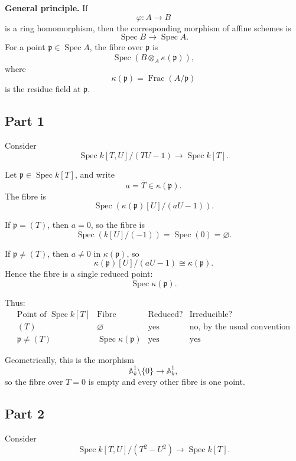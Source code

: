 \documentclass[12pt,a4paper]{article}
\theoremstyle{notespace}
\begin{document}
\textbf{General principle.}
If
\[
\varphi:A\longrightarrow B
\]
is a ring homomorphism, then the corresponding morphism of affine schemes
is
\[
\operatorname{Spec}B\longrightarrow \operatorname{Spec}A.
\]
For a point \(\mathfrak{p}\in \operatorname{Spec}A\), the fibre over
\(\mathfrak{p}\) is
\[
\operatorname{Spec}\left(B\otimes_A \kappa(\mathfrak{p})\right),
\]
where
\[
\kappa(\mathfrak{p})
=
\operatorname{Frac}(A/\mathfrak{p})
\]
is the residue field at \(\mathfrak{p}\).

\subsection{Part 1}

Consider
\[
\operatorname{Spec} k[T,U]/(TU-1)
\longrightarrow
\operatorname{Spec} k[T].
\]

Let \(\mathfrak{p}\in \operatorname{Spec}k[T]\), and write
\[
a=\overline{T}\in \kappa(\mathfrak{p}).
\]
The fibre is
\[
\operatorname{Spec}
\left(
\kappa(\mathfrak{p})[U]/(aU-1)
\right).
\]

If \(\mathfrak{p}=(T)\), then \(a=0\), so the fibre is
\[
\operatorname{Spec}\left(k[U]/(-1)\right)
=
\operatorname{Spec}(0)
=
\varnothing.
\]

If \(\mathfrak{p}\neq (T)\), then \(a\neq 0\) in \(\kappa(\mathfrak{p})\),
so
\[
\kappa(\mathfrak{p})[U]/(aU-1)
\cong
\kappa(\mathfrak{p}).
\]
Hence the fibre is a single reduced point:
\[
\operatorname{Spec}\kappa(\mathfrak{p}).
\]

Thus:
\[
\begin{array}{c|c|c|c}
	\text{Point of } \operatorname{Spec}k[T]
	&
	\text{Fibre}
	&
	\text{Reduced?}
	&
	\text{Irreducible?}
	\\
	\hline
	(T)
	&
	\varnothing
	&
	\text{yes}
	&
	\text{no, by the usual convention}
	\\
	\mathfrak{p}\neq (T)
	&
	\operatorname{Spec}\kappa(\mathfrak{p})
	&
	\text{yes}
	&
	\text{yes}
\end{array}
\]

Geometrically, this is the morphism
\[
\mathbb{A}^1_k\setminus \{0\}\longrightarrow \mathbb{A}^1_k,
\]
so the fibre over \(T=0\) is empty and every other fibre is one point.

\subsection{Part 2}

Consider
\[
\operatorname{Spec} k[T,U]/(T^2-U^2)
\longrightarrow
\operatorname{Spec} k[T].
\]
\end{document}
